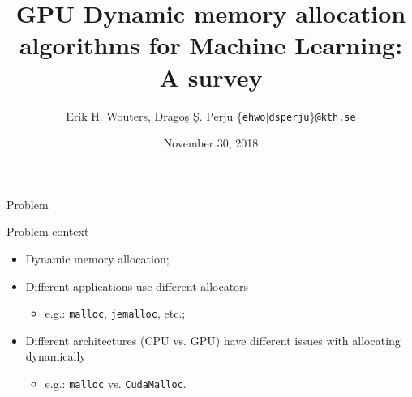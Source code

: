 \documentclass[10pt]{beamer}
\title{GPU Dynamic memory allocation algorithms for Machine Learning: A survey}
\author{Erik H. Wouters, Dragoş Ş. Perju \{\texttt{ehwo}$\mid$\texttt{dsperju}\}\texttt{@kth.se}}
\date{November 30, 2018}
\institute{KTH Royal University of Technology \quad Stockholm, Sweden}
\begin{document}
\maketitle






\begin{frame}[fragile]{Problem}


\begin{exampleblock}{Problem context}
 \begin{itemize}
 \item Dynamic memory allocation;
 \item Different applications use different allocators
     \begin{itemize}
         \item e.g.: \texttt{malloc}, \texttt{jemalloc}, etc.;
     \end{itemize}
 \item Different architectures (CPU vs. GPU) have different issues with allocating dynamically
     \begin{itemize}
         \item e.g.: \texttt{malloc} vs. \texttt{CudaMalloc}.
     \end{itemize}
 \end{itemize}
\end{exampleblock}
\end{frame}
\end{document}
